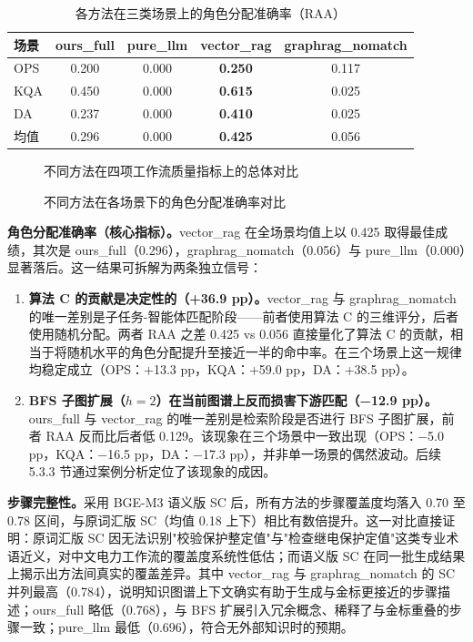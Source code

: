 \begin{table}[htbp]
\centering
\caption{各方法在三类场景上的角色分配准确率（RAA）}
\label{tab:scene_result}
\small
\begin{tabular}{lcccc}
\toprule
场景 & ours\_full & pure\_llm & vector\_rag & graphrag\_nomatch \\
\midrule
OPS & 0.200 & 0.000 & \textbf{0.250} & 0.117 \\
KQA & 0.450 & 0.000 & \textbf{0.615} & 0.025 \\
DA  & 0.237 & 0.000 & \textbf{0.410} & 0.025 \\
\midrule
均值 & 0.296 & 0.000 & \textbf{0.425} & 0.056 \\
\bottomrule
\end{tabular}
\end{table}

\begin{figure}[htbp]
\centering

\caption{不同方法在四项工作流质量指标上的总体对比}
\label{fig:metric_overview}
\end{figure}

\begin{figure}[htbp]
\centering

\caption{不同方法在各场景下的角色分配准确率对比}
\label{fig:raa_by_scene}
\end{figure}

\textbf{角色分配准确率（核心指标）。}vector\_rag 在全场景均值上以 0.425 取得最佳成绩，其次是 ours\_full（0.296），graphrag\_nomatch（0.056）与 pure\_llm（0.000）显著落后。这一结果可拆解为两条独立信号：
\begin{enumerate}
    \item \textbf{算法 C 的贡献是决定性的（+36.9 pp）。}vector\_rag 与 graphrag\_nomatch 的唯一差别是子任务-智能体匹配阶段——前者使用算法 C 的三维评分，后者使用随机分配。两者 RAA 之差 0.425 vs 0.056 直接量化了算法 C 的贡献，相当于将随机水平的角色分配提升至接近一半的命中率。在三个场景上这一规律均稳定成立（OPS：+13.3 pp，KQA：+59.0 pp，DA：+38.5 pp）。
    \item \textbf{BFS 子图扩展（$h=2$）在当前图谱上反而损害下游匹配（−12.9 pp）。}ours\_full 与 vector\_rag 的唯一差别是检索阶段是否进行 BFS 子图扩展，前者 RAA 反而比后者低 0.129。该现象在三个场景中一致出现（OPS：−5.0 pp，KQA：−16.5 pp，DA：−17.3 pp），并非单一场景的偶然波动。后续 5.3.3 节通过案例分析定位了该现象的成因。
\end{enumerate}

\textbf{步骤完整性。}采用 BGE-M3 语义版 SC 后，所有方法的步骤覆盖度均落入 0.70 至 0.78 区间，与原词汇版 SC（均值 0.18 上下）相比有数倍提升。这一对比直接证明：原词汇版 SC 因无法识别"校验保护整定值"与"检查继电保护定值"这类专业术语近义，对中文电力工作流的覆盖度系统性低估；而语义版 SC 在同一批生成结果上揭示出方法间真实的覆盖差异。其中 vector\_rag 与 graphrag\_nomatch 的 SC 并列最高（0.784），说明知识图谱上下文确实有助于生成与金标更接近的步骤描述；ours\_full 略低（0.768），与 BFS 扩展引入冗余概念、稀释了与金标重叠的步骤一致；pure\_llm 最低（0.696），符合无外部知识时的预期。

